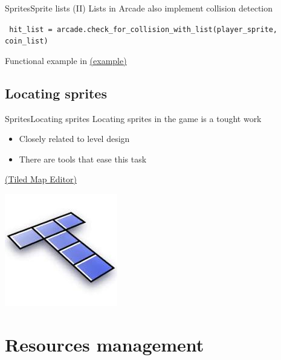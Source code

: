\documentclass[10pt,compress]{beamer} %
\begin{document}
\begin{frame}{Sprites}{Sprite lists (II)}
    Lists in Arcade also implement collision detection 
	\begin{exampleblock}{}
        \texttt{
            hit\_list = arcade.check\_for\_collision\_with\_list(player\_sprite,
                                                              coin\_list)
        }
    \end{exampleblock}

    Functional example in \href{https://gist.github.com/dfbarrero/83294a5ea218ca866b68558d4d64ba46}{(example)}
\end{frame}

\subsection{Locating sprites}

\begin{frame}{Sprites}{Locating sprites}
    Locating sprites in the game is a tought work
    \begin{itemize}
        \item Closely related to \alert{level design}
        \item There are tools that ease this task
    \end{itemize}
    \href{https://www.mapeditor.org/}{(Tiled Map Editor)}

	\vspace{-2.5cm}
    \hfill \includegraphics[width=0.3\linewidth]{figs/tiled}
\end{frame}

\section{Resources management}
\end{document}
